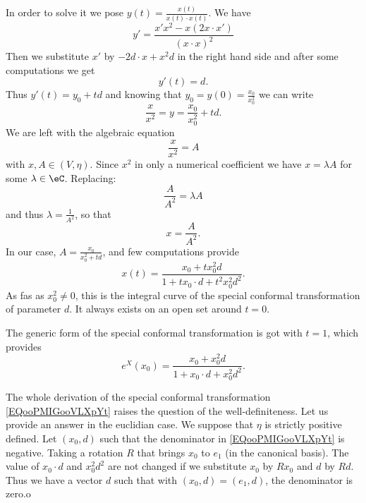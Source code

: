 \begin{description}
		In order to solve it we pose \( y(t)=\frac{ x(t) }{ x(t)\cdot x(t) }\). We have
		\begin{equation}
			y'=\frac{ x'x^2-x(2x\cdot x') }{ (x\cdot x)^2 }
		\end{equation}
		Then we substitute \( x'\) by \( -2d\cdot x+x^2d\) in the right hand side and after some computations we get
		\begin{equation}
			y'(t)=d.
		\end{equation}
		Thus \( y'(t)=y_{0}+td\) and knowing that \( y_0=y(0)=\frac{ x_0 }{ x_0^2 }\) we can write
		\begin{equation}
			\frac{ x }{ x^2 }=y=\frac{ x_0 }{ x_0^2 }+td.
		\end{equation}
		We are left with the algebraic equation
		\begin{equation}
			\frac{ x }{ x^2 }=A
		\end{equation}
		with \( x,A\in(V,\eta)\). Since \( x^2\) in only a numerical coefficient we have \( x=\lambda A\) for some \( \lambda\in \eC\). Replacing:
		\begin{equation}
			\frac{ A }{ A^2 }=\lambda A
		\end{equation}
		and thus \( \lambda=\frac{1}{ A^2 }\), so that
		\begin{equation}
			x=\frac{ A }{ A^2 }.
		\end{equation}
		In our case, \( A=\frac{ x_0 }{ x_0^2+td }\), and few computations provide
		\begin{equation}
			x(t)=\frac{ x_0+tx_0^2d }{ 1+tx_0\cdot d+t^2x_0^2d^2 }.
		\end{equation}
		As fas as \( x_0^2\neq 0\), this is the integral curve of the special conformal transformation of parameter \( d\). It always exists on an open set around \( t=0\).

		The generic form of the special conformal transformation is got with \( t=1\), which provides
		\begin{equation}        \label{EQooPMIGooVLXpYt}
			e^{X}(x_0)=\frac{ x_0+x_0^2d }{ 1+x_0\cdot d+x_0^2d^2 }.
		\end{equation}
\end{description}

The whole derivation of the special conformal transformation \eqref{EQooPMIGooVLXpYt} raises the question of the well-definiteness. Let us provide an answer in the euclidian case. We suppose that \( \eta\) is strictly positive defined. Let \( (x_0,d)\) such that the denominator in \eqref{EQooPMIGooVLXpYt} is negative. Taking a rotation \( R\) that brings \( x_0\) to \( e_1\) (in the canonical basis). The value of \( x_0\cdot d\) and \( x_0^2d^2 \) are not changed if we substitute \( x_0\) by \( Rx_0\) and \( d\) by \( Rd\). Thus we have a vector \( d\) such that with \( (x_0,d)=(e_1,d)\), the denominator is zero.o

